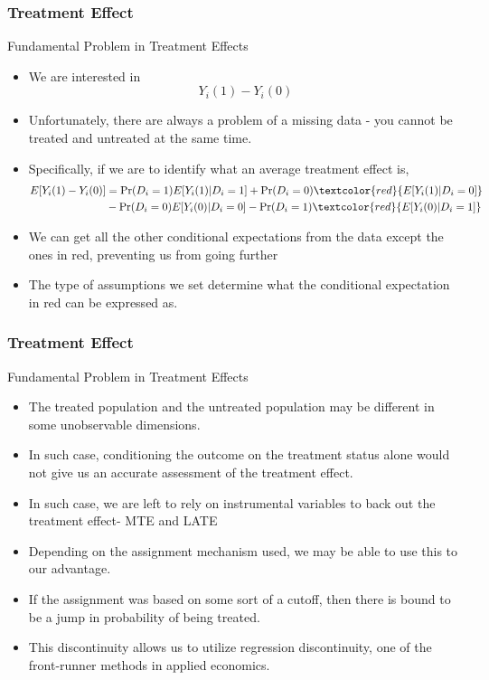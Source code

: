 \documentclass{beamer}
\begin{document}
\begin{frame}
\frametitle{Treatment Effect}
Fundamental Problem in Treatment Effects
\begin{itemize}
\item We are interested in
\[
Y_i(1)-Y_i(0)
\]
\item Unfortunately, there are always a problem of a missing data - you cannot be treated and untreated at the same time.
\item Specifically, if we are to identify what an average treatment effect is,
\small{\begin{align*}
E[Y_i(1)-Y_i(0)]&=\Pr(D_i=1)E[Y_i(1)|D_i=1]+\Pr(D_i=0)\textcolor{red}{E[Y_i(1)|D_i=0]}\\
&-\Pr(D_i=0)E[Y_i(0)|D_i=0]-\Pr(D_i=1)\textcolor{red}{E[Y_i(0)|D_i=1]}
\end{align*}}\normalsize
\item We can get all the other conditional expectations from the data except the ones in red, preventing us from going further
\item The type of assumptions we set determine what the conditional expectation in red can be expressed as.
\end{itemize}
\end{frame}

\begin{frame}
\frametitle{Treatment Effect}
Fundamental Problem in Treatment Effects
\begin{itemize}
\item The treated population and the untreated population may be different in some unobservable dimensions.
\item In such case, conditioning the outcome on the treatment status alone would not give us an accurate assessment of the treatment effect.
\item In such case, we are left to rely on instrumental variables to back out the treatment effect- MTE and LATE
\item Depending on the assignment mechanism used, we may be able to use this to our advantage.
\item If the assignment was based on some sort of a cutoff, then there is bound to be a jump in probability of being treated.
\item  This discontinuity allows us to utilize regression discontinuity, one of the front-runner methods in applied economics. 
\end{itemize}
\end{frame}
\end{document}
